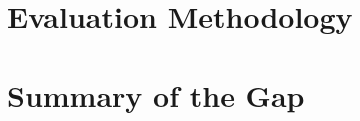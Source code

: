 \section{Evaluation Methodology}
\label{sec:related-eval}

\section{Summary of the Gap}
\label{sec:related-gap}
